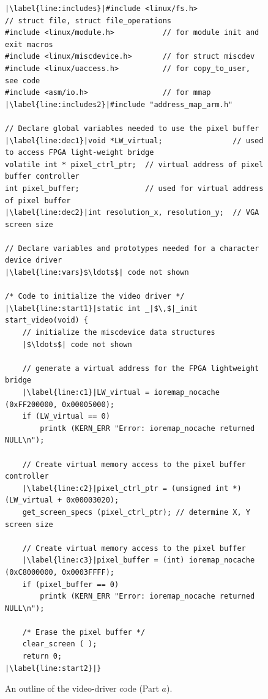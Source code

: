 \documentclass[epsfig,10pt,fullpage]{article}
\begin{document}
\lstset{language=C,numbers=left,escapechar=|}
\begin{figure}[h]
\begin{center}
\begin{minipage}[t]{15 cm}
\begin{lstlisting}[name=dots]
|\label{line:includes}|#include <linux/fs.h>               // struct file, struct file_operations
#include <linux/module.h>           // for module init and exit macros
#include <linux/miscdevice.h>       // for struct miscdev
#include <linux/uaccess.h>          // for copy_to_user, see code
#include <asm/io.h>                 // for mmap
|\label{line:includes2}|#include "address_map_arm.h"

// Declare global variables needed to use the pixel buffer
|\label{line:dec1}|void *LW_virtual;				// used to access FPGA light-weight bridge
volatile int * pixel_ctrl_ptr;	// virtual address of pixel buffer controller
int pixel_buffer;				// used for virtual address of pixel buffer
|\label{line:dec2}|int resolution_x, resolution_y;	// VGA screen size

// Declare variables and prototypes needed for a character device driver
|\label{line:vars}$\ldots$| code not shown

/* Code to initialize the video driver */
|\label{line:start1}|static int _|$\,$|_init start_video(void) {
    // initialize the miscdevice data structures
    |$\ldots$| code not shown

    // generate a virtual address for the FPGA lightweight bridge
    |\label{line:c1}|LW_virtual = ioremap_nocache (0xFF200000, 0x00005000);
    if (LW_virtual == 0)
        printk (KERN_ERR "Error: ioremap_nocache returned NULL\n");

    // Create virtual memory access to the pixel buffer controller
    |\label{line:c2}|pixel_ctrl_ptr = (unsigned int *) (LW_virtual + 0x00003020);
    get_screen_specs (pixel_ctrl_ptr); // determine X, Y screen size

    // Create virtual memory access to the pixel buffer
    |\label{line:c3}|pixel_buffer = (int) ioremap_nocache (0xC8000000, 0x0003FFFF); 
    if (pixel_buffer == 0)
        printk (KERN_ERR "Error: ioremap_nocache returned NULL\n");

    /* Erase the pixel buffer */
    clear_screen ( );
    return 0;
|\label{line:start2}|}
\end{lstlisting}
\end{minipage}
\caption{An outline of the video-driver code (Part $a$).}
\label{fig:video}
\end{center}
\end{figure}
\end{document}
